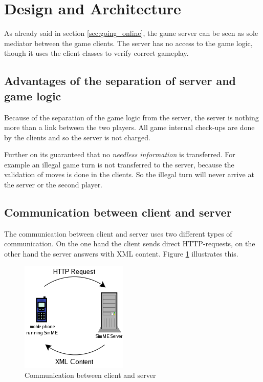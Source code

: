 \section{Design and Architecture} \label{sec:architecture}

	As already said in section \ref{sec:going_online}, the game server can be
	seen as sole mediator between the game clients. The server has no access to
	the game logic, though it uses the client classes to verify correct
	gameplay.

	\subsection{Advantages of the separation of server and game logic}

		Because of the separation of the game logic from the server, the server
		is nothing more than a link between the two players. All game internal
		check-ups are done by the clients and so the server is not charged.
		
		Further on its guaranteed that no \textit{needless information} is
		transferred. For example an illegal game turn is not transferred to the
		server, because the validation of moves is done in the clients. So the
		illegal turn will never arrive at the server or the second player.

	\subsection{Communication between client and server}

		The communication between client and server uses two different types of
		communication. On the one hand the client sends direct HTTP-requests, on
		the other hand the server answers with XML content. Figure
		\ref{fig:com_client_server} illustrates this.

		\begin{figure}[h]
		\begin{center}
			\includegraphics{pics/com_client_server.png}
			\caption{Communication between client and server}
			\label{fig:com_client_server}
		\end{center}
		\end{figure}


